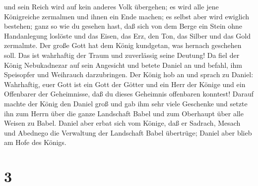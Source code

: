 und sein Reich wird auf kein anderes Volk übergehen; es wird alle jene
Königreiche zermalmen und ihnen ein Ende machen; es selbst aber wird
ewiglich bestehen;  ganz so wie du gesehen hast, daß sich
von dem Berge ein Stein ohne Handanlegung loslöste und das Eisen, das
Erz, den Ton, das Silber und das Gold zermalmte. Der große Gott hat dem
König kundgetan, was hernach geschehen soll. Das ist wahrhaftig der
Traum und zuverlässig seine Deutung!  Da fiel der König
Nebukadnezar auf sein Angesicht und betete Daniel an und befahl, ihm
Speisopfer und Weihrauch darzubringen.  Der König hob an
und sprach zu Daniel: Wahrhaftig, euer Gott ist ein Gott der Götter und
ein Herr der Könige und ein Offenbarer der Geheimnisse, daß du dieses
Geheimnis offenbaren konntest!  Darauf machte der König
den Daniel groß und gab ihm sehr viele Geschenke und setzte ihn zum
Herrn über die ganze Landschaft Babel und zum Oberhaupt über alle Weisen
zu Babel.  Daniel aber erbat sich vom Könige, daß er
Sadrach, Mesach und Abednego die Verwaltung der Landschaft Babel
übertrüge; Daniel aber blieb am Hofe des Königs.

\hypertarget{section-2}{%
\section{3}\label{section-2}}


